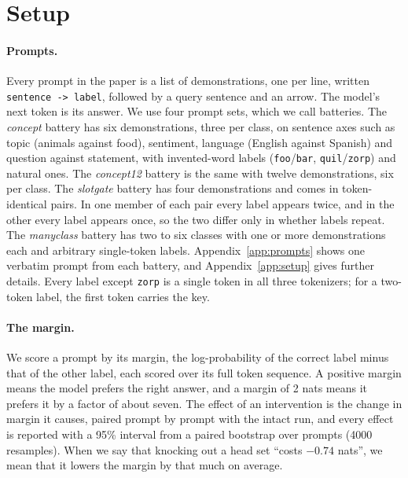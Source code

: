 \documentclass{article}
\begin{document}
\section{Setup}\label{sec:setup}
\paragraph{Prompts.} Every prompt in the paper is a list of demonstrations, one per line, written \texttt{sentence -> label}, followed by a query sentence and an arrow. The model's next token is its answer. We use four prompt sets, which we call batteries. The \emph{concept} battery has six demonstrations, three per class, on sentence axes such as topic (animals against food), sentiment, language (English against Spanish) and question against statement, with invented-word labels (\texttt{foo}/\texttt{bar}, \texttt{quil}/\texttt{zorp}) and natural ones. The \emph{concept12} battery is the same with twelve demonstrations, six per class. The \emph{slotgate} battery has four demonstrations and comes in token-identical pairs. In one member of each pair every label appears twice, and in the other every label appears once, so the two differ only in whether labels repeat. The \emph{manyclass} battery has two to six classes with one or more demonstrations each and arbitrary single-token labels. Appendix~\ref{app:prompts} shows one verbatim prompt from each battery, and Appendix~\ref{app:setup} gives further details. Every label except \texttt{zorp} is a single token in all three tokenizers; for a two-token label, the first token carries the key.

\paragraph{The margin.} We score a prompt by its margin, the log-probability of the correct label minus that of the other label, each scored over its full token sequence. A positive margin means the model prefers the right answer, and a margin of 2 nats means it prefers it by a factor of about seven. The effect of an intervention is the change in margin it causes, paired prompt by prompt with the intact run, and every effect is reported with a 95\% interval from a paired bootstrap over prompts (4000 resamples). When we say that knocking out a head set ``costs $-0.74$ nats'', we mean that it lowers the margin by that much on average.
\end{document}
